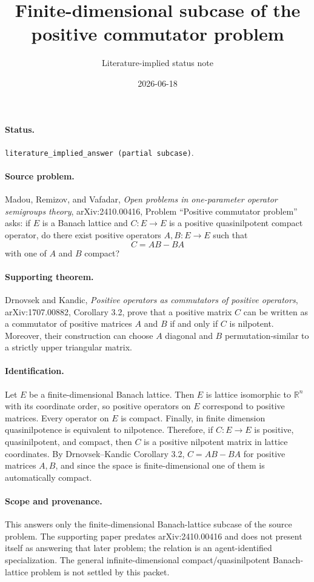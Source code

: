 \documentclass[11pt]{article}
\title{Finite-dimensional subcase of the positive commutator problem}
\author{Literature-implied status note}
\date{2026-06-18}
\begin{document}
\maketitle

\paragraph{Status.}
\texttt{literature\_implied\_answer (partial subcase)}.

\paragraph{Source problem.}
Madou, Remizov, and Vafadar, \emph{Open problems in one-parameter operator semigroups theory}, arXiv:2410.00416, Problem ``Positive commutator problem'' asks:
if \(E\) is a Banach lattice and \(C:E\to E\) is a positive quasinilpotent compact operator, do there exist positive operators \(A,B:E\to E\) such that
\[
  C=AB-BA
\]
with one of \(A\) and \(B\) compact?

\paragraph{Supporting theorem.}
Drnovsek and Kandic, \emph{Positive operators as commutators of positive operators}, arXiv:1707.00882, Corollary 3.2, prove that a positive matrix \(C\) can be written as a commutator of positive matrices \(A\) and \(B\) if and only if \(C\) is nilpotent. Moreover, their construction can choose \(A\) diagonal and \(B\) permutation-similar to a strictly upper triangular matrix.

\paragraph{Identification.}
Let \(E\) be a finite-dimensional Banach lattice. Then \(E\) is lattice isomorphic to \(\mathbb{R}^n\) with its coordinate order, so positive operators on \(E\) correspond to positive matrices. Every operator on \(E\) is compact. Finally, in finite dimension quasinilpotence is equivalent to nilpotence. Therefore, if \(C:E\to E\) is positive, quasinilpotent, and compact, then \(C\) is a positive nilpotent matrix in lattice coordinates. By Drnovsek--Kandic Corollary 3.2, \(C=AB-BA\) for positive matrices \(A,B\), and since the space is finite-dimensional one of them is automatically compact.

\paragraph{Scope and provenance.}
This answers only the finite-dimensional Banach-lattice subcase of the source problem. The supporting paper predates arXiv:2410.00416 and does not present itself as answering that later problem; the relation is an agent-identified specialization. The general infinite-dimensional compact/quasinilpotent Banach-lattice problem is not settled by this packet.
\end{document}
